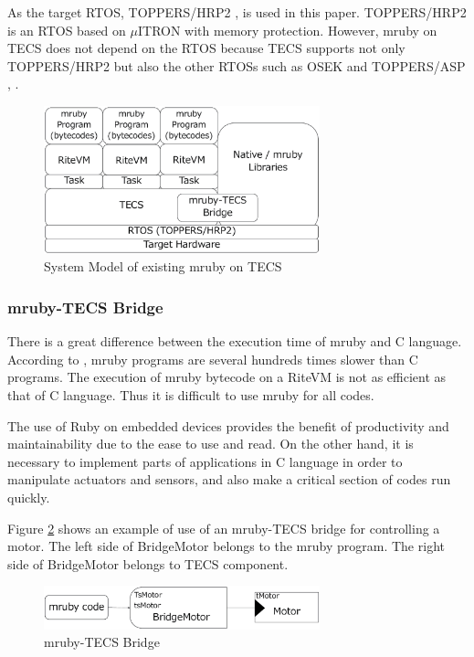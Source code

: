 \documentclass{sig-alternate-05-2015}
\begin{document}
As the target RTOS, TOPPERS/HRP2 \cite{url:HRP2}, \cite{par:hr-tecs} is used in this paper.
TOPPERS/HRP2 is an RTOS based on $\mu$ITRON \cite{par:microITRON} with memory protection.
However, mruby on TECS does not depend on the RTOS because TECS supports not only TOPPERS/HRP2 but also the other RTOSs such as OSEK \cite{par:OSEK} and TOPPERS/ASP \cite{par:ASP}, \cite{url:ASP}.

\begin{figure}[t]
    \centering
    \includegraphics[width=8cm,clip]{figure/mrubyontecs.eps}
    \vspace{1mm}
\caption{System Model of existing mruby on TECS}
    \vspace{1mm}
\label{fig:mrubyontecs}
\end{figure}

\subsubsection{mruby-TECS Bridge}
There is a great difference between the execution time of mruby and C language.
According to  \cite{par:mrubyonTECS}, mruby programs are several hundreds times slower than C programs.
The execution of mruby bytecode on a RiteVM is not as efficient as that of C language.
Thus it is difficult to use mruby for all codes.

The use of Ruby on embedded devices provides the benefit of productivity and maintainability due to the ease to use and read.
On the other hand, it is necessary to implement parts of applications in C language in order to manipulate actuators and sensors, and also make a critical section of codes run quickly.

Figure \ref{fig:mruby_TECS_bridge} shows an example of use of an mruby-TECS bridge for controlling a motor.
The left side of BridgeMotor belongs to the mruby program.
The right side of BridgeMotor belongs to TECS component.
\begin{figure}[t]
    \centering
    \includegraphics[width=8cm,clip]{figure/mruby_TECS_bridge.eps}
    \vspace{1mm}
\caption{mruby-TECS Bridge}
    \vspace{1mm}
\label{fig:mruby_TECS_bridge}
\end{figure}
\end{document}
